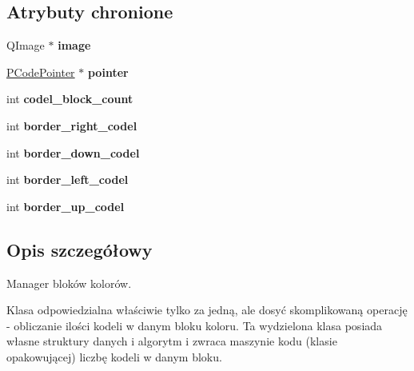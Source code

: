 \subsection*{Atrybuty chronione}
\begin{CompactItemize}
\item 
\hypertarget{classPBlockManager_429ddf44eba8dc97ccd38d67d4b8172f}{
QImage $\ast$ \textbf{image}}
\label{classPBlockManager_429ddf44eba8dc97ccd38d67d4b8172f}

\item 
\hypertarget{classPBlockManager_835bfe00bdbea928d1b4ad6212cf733c}{
\hyperlink{classPCodePointer}{PCodePointer} $\ast$ \textbf{pointer}}
\label{classPBlockManager_835bfe00bdbea928d1b4ad6212cf733c}

\item 
\hypertarget{classPBlockManager_679ed25c188f4a6d2fd20a167a4bb4eb}{
int \textbf{codel\_\-block\_\-count}}
\label{classPBlockManager_679ed25c188f4a6d2fd20a167a4bb4eb}

\item 
\hypertarget{classPBlockManager_8d73c339ef6be4cd3a960b96b0c4f1fe}{
int \textbf{border\_\-right\_\-codel}}
\label{classPBlockManager_8d73c339ef6be4cd3a960b96b0c4f1fe}

\item 
\hypertarget{classPBlockManager_9a2e17b1fa59c0b083e760a385b3565f}{
int \textbf{border\_\-down\_\-codel}}
\label{classPBlockManager_9a2e17b1fa59c0b083e760a385b3565f}

\item 
\hypertarget{classPBlockManager_2bb1887ef5658a211da5edbc3a248058}{
int \textbf{border\_\-left\_\-codel}}
\label{classPBlockManager_2bb1887ef5658a211da5edbc3a248058}

\item 
\hypertarget{classPBlockManager_80de22998ec78cc92162eadd6036506f}{
int \textbf{border\_\-up\_\-codel}}
\label{classPBlockManager_80de22998ec78cc92162eadd6036506f}

\end{CompactItemize}


\subsection{Opis szczegółowy}
Manager bloków kolorów. 

Klasa odpowiedzialna właściwie tylko za jedną, ale dosyć skomplikowaną operację - obliczanie ilości kodeli w danym bloku koloru. Ta wydzielona klasa posiada własne struktury danych i algorytm i zwraca maszynie kodu (klasie opakowującej) liczbę kodeli w danym bloku. 

